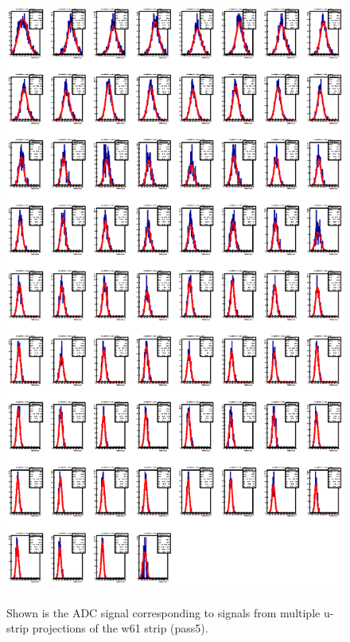 \begin{figure}[h]
    \centering
    \includegraphics[width=\textwidth, height= 8in, keepaspectratio = true]{w61sigfitpass5}
    \caption{Shown is the ADC signal corresponding to signals from multiple u-strip projections of the w61 strip (pass5).}
    \label{fig:w61sigfitpass5}
\end{figure}


\FloatBarrier

